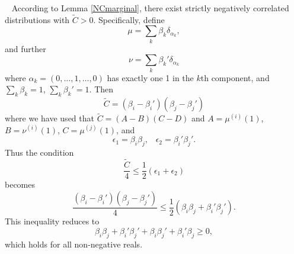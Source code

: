 \documentclass[11pt]{article}
\newenvironment{Proof}{\noindent{\bf Proof} \ }{\QED}\smallskip
\newcommand\QED{\newline \rightline{$\blacksquare$} \bigskip}
\begin{document}
\begin{Proof}
According to Lemma \ref{NCmarginal}, there exist strictly negatively correlated distributions with $\tilde{C}>0$. Specifically, define 
\[
\mu = \sum_k \beta_k \delta_{\alpha_k},
\]
and further
\[
\nu = \sum_k \beta_k' \delta_{\alpha_k}
\]
where $\alpha_k = (0,\dots, 1,\dots, 0)$ has exactly one 1 in the $k$th component, and $\sum _k \beta_k =1$, $\sum_k \beta_k'=1$. 
Then 
\[
\tilde{C} = (\beta_i -\beta_i')(\beta_j - \beta_j')
\]
where we have used that  $\tilde{C}=(A-B)(C-D)$ and $A= \mu^{(i)}(1)$, $B= \nu^{(i)}(1)$, $C= \mu^{(j)}(1)$,
and 
\[
\epsilon_1 = \beta_i\beta_j,
\;\;\;\epsilon_2 =\beta_i'\beta_j'.
\]
Thus the condition 
\[
\frac{\tilde{C}}{4} \leq \frac{1}{2}(\epsilon_1+\epsilon_2)
\]
becomes 
\[
\frac{(\beta_i -\beta_i')(\beta_j - \beta_j')}{4} \leq \frac{1}{2}(\beta_i\beta_j+\beta_i'\beta_j').
\]
This inequality reduces to 
\[
\beta_i\beta_j +\beta_i'\beta_j' +\beta_i\beta_j' + \beta_i'\beta_j\geq 0,
\]
which holds for all non-negative reals.  %


\end{Proof}
\end{document}
